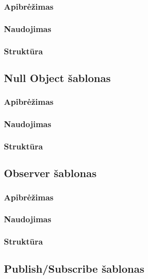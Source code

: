 \documentclass[10pt]{IEEEtran}
\begin{document}
			\subsubsection{Apibrėžimas}

			\subsubsection{Naudojimas}

			\subsubsection{Struktūra}

		\subsection{Null Object šablonas}

			\subsubsection{Apibrėžimas}

			\subsubsection{Naudojimas}

			\subsubsection{Struktūra}

		\subsection{Observer šablonas}

			\subsubsection{Apibrėžimas}

			\subsubsection{Naudojimas}

			\subsubsection{Struktūra}

		
		\subsection{Publish/Subscribe šablonas}
\end{document}
